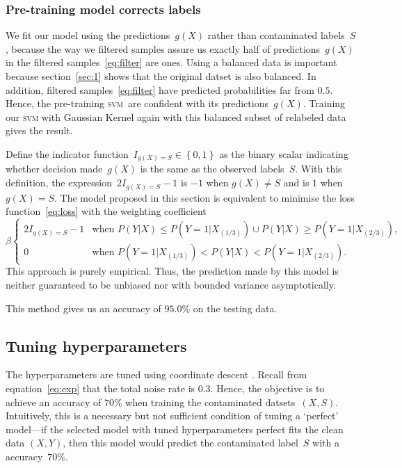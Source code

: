 \documentclass[12pt]{article} %
\newcommand{\svm}{\textsc{svm}}
\begin{document}
\subsubsection{Pre-training model corrects labels}
We fit our model using the predictions~$g(X)$ rather than contaminated labels~$S$, because the way we filtered samples  assure us exactly half of predictions~$g(X)$ in the filtered samples~\eqref{eq:filter}  are ones.
Using a balanced data is important because section~\ref{sec:1} shows that the original datset is also balanced. In addition, filtered samples~\eqref{eq:filter} have  predicted probabilities far from $0.5$. Hence, the pre-training \svm\ are confident with its predictions~$g(X)$.
Training our \textsc{svm} with Gaussian Kernel again with this balanced subset of relabeled data gives the result.

Define the indicator function~$I_{g(X)=S} \in \left\{0,1\right\}$ as the binary scalar indicating whether decision made~$g(X)$ is the same as the observed labels~$S$. With this definition, the expression~$2I_{g(X)=S}-1$ is $-1$ when $g(X)\neq S$ and is $1$ when $g(X)=S$.  The model proposed in this section is equivalent to minimise the loss function~\eqref{eq:loss} with the weighting coefficient
\begin{equation*}
\beta\begin{cases}
2I_{g(X)=S}-1 & \text{when }P({Y}|X)\leq P(Y=1|X_{(1/3)}) \cup P({Y}|X)\geq P(Y=1|X_{(2/3)}),\\
0 & \text{when }P(Y=1|X_{(1/3)})<P({Y}|X)<P(Y=1|X_{(2/3)}).
\end{cases}
\end{equation*}
This approach is purely empirical. Thus, the prediction made by this model is neither guaranteed to be unbiased nor with bounded variance asymptotically.

This method gives us an accuracy of $95.0\%$ on the testing data.


\subsection{Tuning hyperparameters}\label{tune}
The hyperparameters are tuned using coordinate descent \citep{hastie01statisticallearning}. Recall from equation~\eqref{eq:exp} that the total noise rate is 0.3. Hence,  the objective is to achieve an accuracy of $70\%$ when training the contaminated datsets~$(X,S)$. Intuitively, this is a necessary but not sufficient condition of tuning a `perfect' model---if the selected model with tuned hyperparameters perfect fits the clean data $(X,Y)$, then this model would predict the contaminated label~$S$ with a accuracy~$70\%$.
\end{document}
